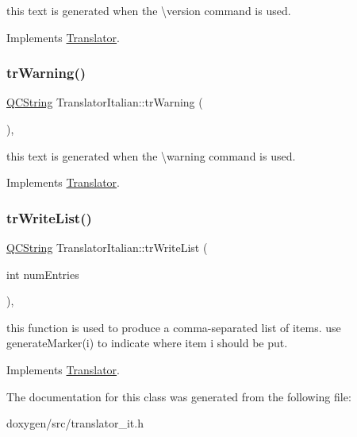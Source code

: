 this text is generated when the \textbackslash{}version command is used. 

Implements \mbox{\hyperlink{class_translator}{Translator}}.

\mbox{\label{class_translator_italian_aec599f2697a349395fe31e0753fe5f09}} 
\subsubsection{\texorpdfstring{trWarning()}{trWarning()}}
{\footnotesize\ttfamily \mbox{\hyperlink{class_q_c_string}{Q\+C\+String}} Translator\+Italian\+::tr\+Warning (\begin{DoxyParamCaption}{ }\end{DoxyParamCaption})\hspace{0.3cm}{\ttfamily [inline]}, {\ttfamily [virtual]}}

this text is generated when the \textbackslash{}warning command is used. 

Implements \mbox{\hyperlink{class_translator}{Translator}}.

\mbox{\label{class_translator_italian_a13aeae67ed6cf46e1a82eb38f408d53f}} 
\subsubsection{\texorpdfstring{trWriteList()}{trWriteList()}}
{\footnotesize\ttfamily \mbox{\hyperlink{class_q_c_string}{Q\+C\+String}} Translator\+Italian\+::tr\+Write\+List (\begin{DoxyParamCaption}\item[{int}]{num\+Entries }\end{DoxyParamCaption})\hspace{0.3cm}{\ttfamily [inline]}, {\ttfamily [virtual]}}

this function is used to produce a comma-\/separated list of items. use generate\+Marker(i) to indicate where item i should be put. 

Implements \mbox{\hyperlink{class_translator}{Translator}}.



The documentation for this class was generated from the following file\+:\begin{DoxyCompactItemize}
\item 
doxygen/src/translator\+\_\+it.\+h\end{DoxyCompactItemize}
